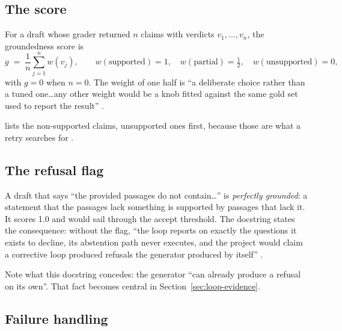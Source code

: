 \subsection{The score}

For a draft whose grader returned $n$ claims with verdicts $v_1,\dots,v_n$, the groundedness score is
\begin{equation}
g \;=\; \frac{1}{n}\sum_{j=1}^{n} w(v_j), \qquad w(\text{supported})=1,\quad w(\text{partial})=\tfrac12,\quad w(\text{unsupported})=0,
\end{equation}
with $g = 0$ when $n = 0$. The weight of one half is \enquote{a deliberate choice rather than a tuned one\ldots any other weight would be a knob fitted against the same gold set used to report the result} .

 lists the non-supported claims, unsupported ones first, because those are what a retry searches for .

\subsection{The refusal flag}

\begin{keyidea}
A draft that says \enquote{the provided passages do not contain\ldots} is \emph{perfectly grounded}: a statement that the passages lack something is supported by passages that lack it. It scores 1.0 and would sail through the accept threshold. The docstring states the consequence: without the flag, \enquote{the loop reports  on exactly the questions it exists to decline, its abstention path never executes, and the project would claim a corrective loop produced refusals the generator produced by itself} .
\end{keyidea}

Note what this docstring concedes: the generator \enquote{can already produce a refusal on its own}. That fact becomes central in Section~\ref{sec:loop-evidence}.

\subsection{Failure handling}

